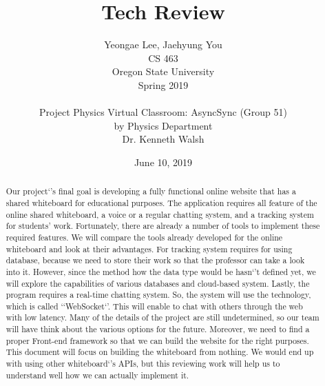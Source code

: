 \documentclass[10pt]{article}
\begin{document}
\begin{titlepage}
    \title{Tech Review}
    \author{Yeongae Lee, Jaehyung You \\ CS 463  \\ Oregon State University \\ Spring 2019 \\ \\ Project Physics Virtual Classroom: AsyncSync (Group 51) \\by Physics Department \\Dr. Kenneth Walsh}
    \date {June 10, 2019}

  
    \maketitle
        \begin{abstract}
            Our project`’s final goal is developing a fully functional online website that has a shared whiteboard for educational purposes. The application requires all feature of the online shared whiteboard, a voice or a regular chatting system, and a tracking system for students’ work. Fortunately, there are already a number of tools to implement these required features. We will compare the tools already developed for the online whiteboard and look at their advantages. For tracking system requires for using database, because we need to store their work so that the professor can take a look into it.  However, since the method how the data type would be hasn`’t defined yet, we will explore the capabilities of various databases and cloud-based system. Lastly, the program requires a real-time chatting system. So, the system will use the technology, which is called `‘WebSocket`’. This will enable to chat with others through the web with low latency. Many of the details of the project are still undetermined, so our team will have think about the various options for the future. Moreover, we need to find a proper Front-end framework so that we can build the website for the right purposes. This document will focus on building the whiteboard from nothing. We would end up with using other whiteboard`'s APIs, but this reviewing work will help us to understand well how we can actually implement it. 
        \end{abstract}     
\end{titlepage}
\maketitle
\end{document}

